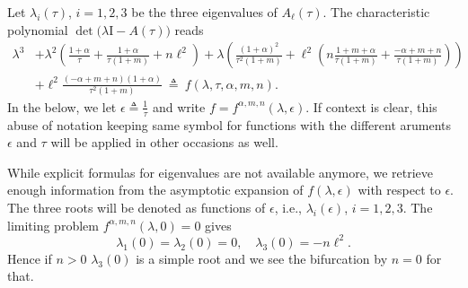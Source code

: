 \documentclass[a4paper,11pt]{article}
\def\l{{\ell}}
\theoremstyle{remark}
\begin{document}
{Let $\lambda_i(\tau)$, $i=1,2,3$ be the three eigenvalues of $A_\ell(\tau)$. %
The characteristic polynomial $\det\big(\lambda \textrm{I} - A(\tau)\big)$ reads
\begin{equation}
\begin{aligned}
 \lambda^3 &+ \lambda^2\left( \tfrac{1+\alpha}{\tau} + \tfrac{1+\alpha}{\tau(1+m)} + n\l^2\right)
 + \lambda\left( \tfrac{(1+\alpha)^2}{\tau^2(1+m)}
 + \l^2\left( n\tfrac{1+m+\alpha}{\tau(1+m)} + \tfrac{-\alpha+m+n}{\tau(1+m)}\right)\right) \\
 &+ \l^2\tfrac{(-\alpha+m+n)(1+\alpha)}{\tau^2(1+m)} \: \triangleq \: f(\lambda,\tau,\alpha,m,n). \label{eq:poly}
\end{aligned}
\end{equation}
In the below, we let $\epsilon\triangleq \frac{1}{\tau}$ and write $f = f^{\alpha,m,n}(\lambda,\epsilon)$. If context is clear, this abuse of notation keeping same symbol for functions with the different aruments $\epsilon$ and $\tau$ will be applied in other occasions as well.

While explicit formulas for eigenvalues are not available anymore, we retrieve enough information from the asymptotic expansion of $f(\lambda,\epsilon)$ with respect to $\epsilon$. The three roots will be denoted as functions of $\epsilon$, i.e., $\lambda_i(\epsilon)$, $i=1,2,3$. The limiting problem $f^{\alpha,m,n}(\lambda,0)=0$ gives
$$ \lambda_1(0)=\lambda_2(0)=0, \quad \lambda_3(0) = -n\l^2.$$
Hence if $n>0$ $\lambda_3(0)$ is a simple root and we see the bifurcation by $n=0$ for that.

}
\end{document}
